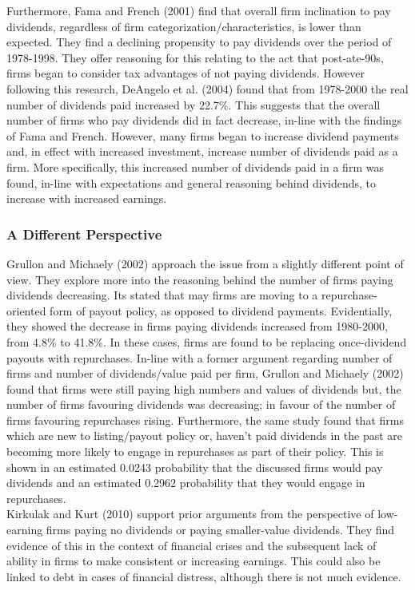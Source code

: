 \documentclass[11pt, english]{article}
\begin{document}
	Furthermore, Fama and French (2001) find that overall firm inclination to pay dividends, regardless of firm categorization/characteristics, is lower than expected. They find a declining propensity to pay dividends over the period of 1978-1998. They offer reasoning for this relating to the act that post-ate-90s, firms began to consider tax advantages of not paying dividends. However following this research, DeAngelo et al. (2004) found that from 1978-2000 the real number of dividends paid increased by 22.7\%. This suggests that the overall number of firms who pay dividends did in fact decrease, in-line with the findings of Fama and French. However, many firms began to increase dividend payments and, in effect with increased investment, increase number of dividends paid as a firm. More specifically, this increased number of dividends paid in a firm was found, in-line with expectations and general reasoning behind dividends, to increase with increased earnings.

		\subsubsection*{A Different Perspective}

	Grullon and Michaely (2002) approach the issue from a slightly different point of view. They explore more into the reasoning behind the number of firms paying dividends decreasing. Its stated that may firms are moving to a repurchase- oriented form of payout policy, as opposed to dividend payments. Evidentially, they showed the decrease in firms paying dividends increased from 1980-2000, from 4.8\% to 41.8\%. In these cases, firms are found to be replacing once-dividend payouts with repurchases. In-line with a former argument regarding number of firms and number of dividends/value paid per firm, Grullon and Michaely (2002) found that firms were still paying high numbers and values of dividends but, the number of firms favouring dividends was decreasing; in favour of the number of firms favouring repurchases rising. Furthermore, the same study found that firms which are new to listing/payout policy or, haven't paid dividends in the past are becoming more likely to engage in repurchases as part of their policy. This is shown in an estimated 0.0243 probability that the discussed firms would pay dividends and an estimated 0.2962 probability that they would engage in repurchases.\\

	Kirkulak and Kurt (2010) support prior arguments from the perspective of low- earning firms paying no dividends or paying smaller-value dividends. They find evidence of this in the context of financial crises and the subsequent lack of ability in firms to make consistent or increasing earnings. This could also be linked to debt in cases of financial distress, although there is not much evidence.
\end{document}
